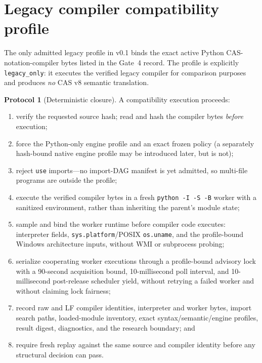 \documentclass[11pt]{amsart}
\theoremstyle{definition}
\newtheorem{protocol}[theorem]{Protocol}
\theoremstyle{remark}
\begin{document}
\section{Legacy compiler compatibility profile}\label{sec:compat}

The only admitted legacy profile in v0.1 binds the exact active Python CAS-notation-compiler bytes listed in the Gate~4 record. The profile is explicitly \texttt{legacy\_only}: it executes the verified legacy compiler for comparison purposes and produces \emph{no} CAS v8 semantic translation.

\begin{protocol}[Deterministic closure]\label{prot:closure}
A compatibility execution proceeds:
\begin{enumerate}
\item verify the requested source hash; read and hash the compiler bytes \emph{before} execution;
\item force the Python-only engine profile and an exact frozen policy (a separately hash-bound native engine profile may be introduced later, but is not);
\item reject \texttt{use} imports---no import-DAG manifest is yet admitted, so multi-file programs are outside the profile;
\item execute the verified compiler bytes in a fresh \texttt{python -I -S -B} worker with a sanitized environment, rather than inheriting the parent's module state;
\item sample and bind the worker runtime before compiler code executes: interpreter fields, \texttt{sys.platform}/POSIX \texttt{os.uname}, and the profile-bound Windows architecture inputs, without WMI or subprocess probing;
\item serialize cooperating worker executions through a profile-bound advisory lock with a 90-second acquisition bound, 10-millisecond poll interval, and 10-millisecond post-release scheduler yield, without retrying a failed worker and without claiming lock fairness;
\item record raw and LF compiler identities, interpreter and worker bytes, import search paths, loaded-module inventory, exact syntax/semantic/engine profiles, result digest, diagnostics, and the research boundary; and
\item require fresh replay against the same source and compiler identity before any structural decision can pass.
\end{enumerate}
\end{protocol}
\end{document}
